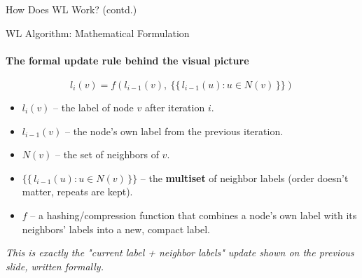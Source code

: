 \documentclass[aspectratio=169, 11pt]{beamer}
\begin{document}
\begin{frame}{How Does WL Work? \textnormal{\footnotesize(contd.)}}
\end{frame}

\begin{frame}{WL Algorithm: Mathematical Formulation}
    \framesubtitle{The formal update rule behind the visual picture}

    \begin{center}
        \Large
        $$ l_i(v) = f\left(l_{i-1}(v),\ \{\!\{\, l_{i-1}(u) : u \in N(v) \,\}\!\}\right) $$
    \end{center}

    \vspace{0.2cm}
    \begin{itemize}
        \item $l_i(v)$ -- the label of node $v$ after iteration $i$.
        \item $l_{i-1}(v)$ -- the node's own label from the previous iteration.
        \item $N(v)$ -- the set of neighbors of $v$.
        \item $\{\!\{\, l_{i-1}(u) : u \in N(v) \,\}\!\}$ -- the \textbf{multiset}
        of neighbor labels (order doesn't matter, repeats are kept).
        \item $f$ -- a hashing/compression function that combines a node's own
        label with its neighbors' labels into a new, compact label.
    \end{itemize}

    \vspace{0.15cm}
    {\footnotesize\itshape This is exactly the "current label + neighbor
    labels" update shown on the previous slide, written formally.}
\end{frame}
\end{document}
